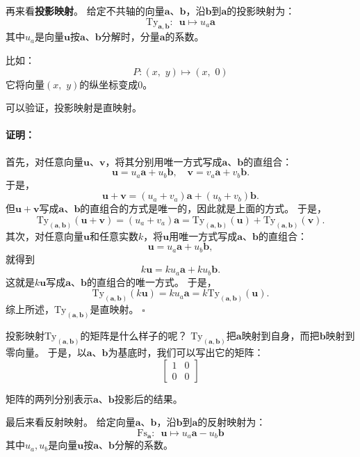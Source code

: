 \documentclass[12pt,UTF8]{ctexbook}
\renewenvironment{proof}{\paragraph{\textbf{证明：}}}{\hfill$\square$}
\begin{document}
再来看\textbf{投影映射}。
给定不共轴的向量$\mathbf{a}$、$\mathbf{b}$，沿$\mathbf{b}$到$\mathbf{a}$的投影映射为：
$$ \mathrm{Ty}_{\mathbf{a}, \mathbf{b}} : \,\,\, \mathbf{u} \mapsto u_a \mathbf{a} $$
其中$u_a$是向量$\mathbf{u}$按$\mathbf{a}$、$\mathbf{b}$分解时，分量$\mathbf{a}$的系数。

比如：
$$ P: (x,\,\, y) \mapsto (x,\,\,0)$$
它将向量$(x,\,\, y)$的纵坐标变成$0$。

可以验证，投影映射是直映射。
\begin{proof}
    首先，对任意向量$\mathbf{u}$、$\mathbf{v}$，将其分别用唯一方式写成$\mathbf{a}$、$\mathbf{b}$的直组合：
    $$ \mathbf{u} = u_a \mathbf{a} + u_b \mathbf{b},\quad \mathbf{v} = v_a \mathbf{a} + v_b \mathbf{b}.$$
    于是，
    $$ \mathbf{u} + \mathbf{v} = (u_a + v_a) \mathbf{a} + (u_b + v_b) \mathbf{b}. $$
    但$\mathbf{u} + \mathbf{v}$写成$\mathbf{a}$、$\mathbf{b}$的直组合的方式是唯一的，因此就是上面的方式。
    于是，
    $$ \mathrm{Ty}_{(\mathbf{a},\mathbf{b})} (\mathbf{u} + \mathbf{v}) = (u_a + v_a) \mathbf{a} = \mathrm{Ty}_{(\mathbf{a},\mathbf{b})} (\mathbf{u}) + \mathrm{Ty}_{(\mathbf{a},\mathbf{b})} (\mathbf{v}).$$
    其次，对任意向量$\mathbf{u}$和任意实数$k$，将$\mathbf{u}$用唯一方式写成$\mathbf{a}$、$\mathbf{b}$的直组合：
    $$ \mathbf{u} = u_a \mathbf{a} + u_b \mathbf{b},$$
    就得到
    $$ k\mathbf{u} = ku_a \mathbf{a} + ku_b \mathbf{b}.$$
    这就是$k\mathbf{u}$写成$\mathbf{a}$、$\mathbf{b}$的直组合的唯一方式。
    于是，
    $$ \mathrm{Ty}_{(\mathbf{a},\mathbf{b})} (k\mathbf{u}) = ku_a \mathbf{a} = k \mathrm{Ty}_{(\mathbf{a},\mathbf{b})} (\mathbf{u}). $$
    综上所述，$\mathrm{Ty}_{(\mathbf{a},\mathbf{b})}$是直映射。
\end{proof}

投影映射$\mathrm{Ty}_{(\mathbf{a},\mathbf{b})}$的矩阵是什么样子的呢？
$\mathrm{Ty}_{(\mathbf{a},\mathbf{b})}$把$\mathbf{a}$映射到自身，而把$\mathbf{b}$映射到零向量。
于是，以$\mathbf{a}$、$\mathbf{b}$为基底时，我们可以写出它的矩阵：
$$
\begin{bmatrix}
    1 & 0 \\ 0 & 0
\end{bmatrix}
$$

矩阵的两列分别表示$\mathbf{a}$、$\mathbf{b}$投影后的结果。

最后来看反射映射。
给定向量$\mathbf{a}$、$\mathbf{b}$，沿$\mathbf{b}$到$\mathbf{a}$的反射映射为：
$$ \mathrm{Fs}_{\mathbf{a}} : \,\,\, \mathbf{u} \mapsto u_a \mathbf{a} - u_b \mathbf{b} $$
其中$u_a, u_b$是向量$\mathbf{u}$按$\mathbf{a}$、$\mathbf{b}$分解的系数。
\end{document}
